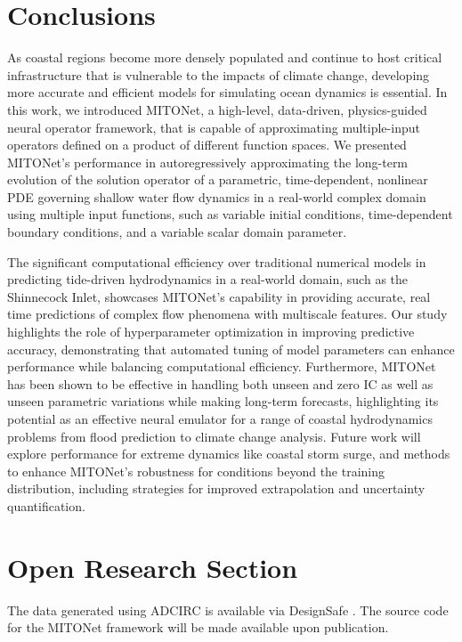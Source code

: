 \documentclass[draft]{agujournal2019}
\begin{document}
\section{Conclusions} 

As coastal regions become more densely populated and continue to host critical infrastructure that is vulnerable to the impacts of climate change, developing more accurate and efficient models for simulating ocean dynamics is essential. In this work, we introduced MITONet, a high-level, data-driven, physics-guided neural operator framework, that is capable of approximating multiple-input operators defined on a product of different function spaces. We presented MITONet's performance in autoregressively approximating the long-term evolution of the solution operator of a parametric, time-dependent, nonlinear PDE governing shallow water flow dynamics in a real-world complex domain using multiple input functions, such as variable initial conditions, time-dependent boundary conditions, and a variable scalar domain parameter. 

The significant computational efficiency over traditional numerical models in predicting tide-driven hydrodynamics in a real-world domain, such as the Shinnecock Inlet, showcases MITONet's capability in providing accurate, real time predictions of complex flow phenomena with multiscale features. Our study highlights the role of hyperparameter optimization in improving predictive accuracy, demonstrating that automated tuning of model parameters can enhance performance while balancing computational efficiency. Furthermore, MITONet has been shown to be effective in handling both unseen and zero IC as well as unseen parametric variations while making long-term forecasts, highlighting its potential as an effective neural emulator for a range of coastal hydrodynamics problems from flood prediction to climate change analysis. Future work will explore performance for extreme dynamics like coastal storm surge, and methods to enhance MITONet’s robustness for conditions beyond the training distribution, including strategies for improved extrapolation and uncertainty quantification.

\section*{Open Research Section}
The data generated using ADCIRC is available via DesignSafe \cite{casillas2024designsafe}. The source code for the MITONet framework will be made available upon publication. 
\end{document}

